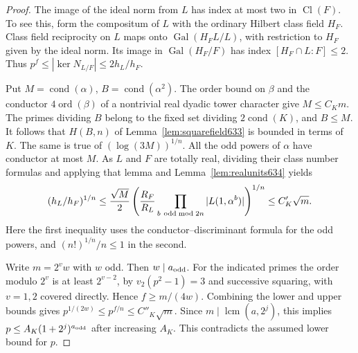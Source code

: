\documentclass[a4paper,11pt]{article}
\theoremstyle{definition}
\theoremstyle{remark}
\numberwithin{equation}{section}
\begin{document}
\begin{proof}
The image of the ideal norm from \(L\) has index at most two in
\(\operatorname{Cl}(F)\). To see this, form the compositum of \(L\)
with the ordinary Hilbert class field \(H_F\). Class field reciprocity
on \(L\) maps onto \(\operatorname{Gal}(H_FL/L)\), with restriction
to \(H_F\) given by the ideal norm. Its image in
\(\operatorname{Gal}(H_F/F)\) has index \([H_F\cap L:F]\le2\).
Thus \(p^f\le|\ker N_{L/F}|\le2 h_L/h_F\).

Put \(M=\operatorname{cond}(\alpha)\), \(B=\operatorname{cond}(\alpha^2)\).
The order bound on \(\beta\) and the conductor \(4\operatorname{ord}(\beta)\)
of a nontrivial real dyadic tower character give \(M\le C_K m\).
The primes dividing \(B\) belong to the fixed set dividing
\(2\operatorname{cond}(K)\), and \(B\le M\). It follows that
\(H(B,n)\) of Lemma~\ref{lem:squarefield633} is bounded in terms of
\(K\). The same is true of \((\log(3M))^{1/n}\). All the odd powers
of \(\alpha\) have conductor at most \(M\). As \(L\) and \(F\) are
totally real, dividing their class number formulas and applying that
lemma and Lemma~\ref{lem:realunits634} yields
\[
   (h_L/h_F)^{1/n}
     \le \frac{\sqrt M}{2}
              \left(\frac{R_F}{R_L}
                     \prod_{b\ {\rm odd}\bmod 2n}|L(1,\alpha^b)|
              \right)^{1/n}
     \le C'_K\sqrt m .
\]
Here the first inequality uses the conductor--discriminant formula
for the odd powers, and \((n!)^{1/n}/n\le1\) in the second.

Write \(m=2^v w\) with \(w\) odd. Then \(w\mid a_{\rm odd}\).
For the indicated primes the order modulo \(2^v\) is at least
\(2^{v-2}\), by \(v_2(p^2-1)=3\) and successive squaring, with
\(v=1,2\) covered directly. Hence \(f\ge m/(4w)\).
Combining the lower and upper bounds gives
\(p^{1/(2w)}\le p^{f/n}\le C''_K\sqrt m\).
Since \(m\mid\operatorname{lcm}(a,2^j)\), this implies
\(p\le A_K(1+2^j)^{a_{\rm odd}}\) after increasing \(A_K\).
This contradicts the assumed lower bound for \(p\).
\end{proof}
\end{document}
